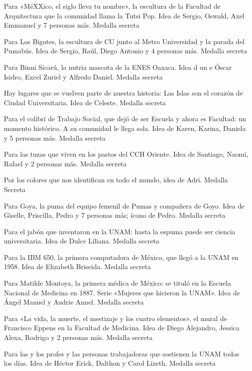 \begin{description}[leftmargin=1.4cm, style=nextline]
  \item[TUTS1] Para «MéXXico, el siglo lleva tu nombre», la escultura de la Facultad de Arquitectura que la comunidad llama la Tutsi Pop. Idea de Sergio, Oswald, Axel Emmanuel y 7 personas más. Medalla secreta
  \item[B1G0T3S] Para Los Bigotes, la escultura de CU junto al Metro Universidad y la parada del Pumabús. Idea de Sergio, Raúl, Diego Antonio y 4 personas más. Medalla secreta
  \item[B1NN104X] Para Binni Sicarú, la nutria mascota de la ENES Oaxaca. Idea d un e Óscar Isidro, Excel Zuriel y Alfredo Daniel. Medalla secreta
  \item[1SL4SCU] Hay lugares que se vuelven parte de nuestra historia: Las Islas son el corazón de Ciudad Universitaria. Idea de Celeste. Medalla secreta
  \item[C0L1BR1] Para el colibrí de Trabajo Social, que dejó de ser Escuela y ahora es Facultad: un momento histórico. A su comunidad le llega sola. Idea de Karen, Karina, Daniela y 5 personas más. Medalla secreta
  \item[TUZ4S0R] Para las tuzas que viven en los pastos del CCH Oriente. Idea de Santiago, Naomi, Rafael y 2 personas más. Medalla secreta
  \item[4ZUL0R0] Por los colores que nos identifican en todo el mundo, idea de Adri. Medalla Secreta
  \item[G0Y4] Para Goya, la puma del equipo femenil de Pumas y compañera de Goyo. Idea de Giselle, Priscilla, Pedro y 7 personas más; ícono de Pedro. Medalla secreta
  \item[ESPUM1T4] Para el jabón que inventaron en la UNAM: hasta la espuma puede ser ciencia universitaria. Idea de Dulce Liliana. Medalla secreta
  \item[IBM650] Para la IBM 650, la primera computadora de México, que llegó a la UNAM en 1958. Idea de Elizabeth Briseida. Medalla secreta
  \item[M0NT0Y4] Para Matilde Montoya, la primera médica de México: se tituló en la Escuela Nacional de Medicina en 1887. Serie «Mujeres que hicieron la UNAM». Idea de Ángel Manuel y Audrie Annel. Medalla secreta
  \item[3PP3NSFM] Para «La vida, la muerte, el mestizaje y los cuatro elementos», el mural de Francisco Eppens en la Facultad de Medicina. Idea de Diego Alejandro, Jessica Alexa, Rodrigo y 2 personas más. Medalla secreta
  \item[PR0F3S] Para las y los profes y las personas trabajadoras que sostienen la UNAM todos los días. Idea de Héctor Erick, Dalthon y Carol Lizeth. Medalla secreta

\end{description}
